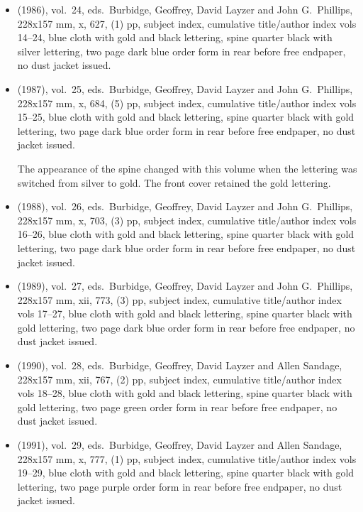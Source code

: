 \begin{itemize}
	\item (1986), vol.\ 24, eds.\ Burbidge, Geoffrey, David Layzer and John G.\ Phillips, 228x157 mm,
	x, 627, (1) pp, subject index, cumulative title/author index vols 14--24,
	blue cloth with gold and black lettering, spine quarter black with silver lettering,
	two page dark blue order form in rear before free endpaper, no dust jacket issued.

	\item (1987), vol.\ 25, eds.\ Burbidge, Geoffrey, David Layzer and John G.\ Phillips, 228x157 mm,
	x, 684, (5) pp, subject index, cumulative title/author index vols 15--25,
	blue cloth with gold and black lettering, spine quarter black with gold lettering,
	two page dark blue order form in rear before free endpaper, no dust jacket issued.
	
	The appearance of the spine changed with this volume when the lettering was switched
	from silver to gold.  The front cover retained the gold lettering. 

	\item (1988), vol.\ 26, eds.\ Burbidge, Geoffrey, David Layzer and John G.\ Phillips, 228x157 mm,
	x, 703, (3) pp, subject index, cumulative title/author index vols 16--26,
	blue cloth with gold and black lettering, spine quarter black with gold lettering,
	two page dark blue order form in rear before free endpaper, no dust jacket issued.

	\item (1989), vol.\ 27, eds.\ Burbidge, Geoffrey, David Layzer and John G.\ Phillips, 228x157 mm,
	xii, 773, (3) pp, subject index, cumulative title/author index vols 17--27,
	blue cloth with gold and black lettering, spine quarter black with gold lettering,
	two page dark blue order form in rear before free endpaper, no dust jacket issued.

	\item (1990), vol.\ 28, eds.\ Burbidge, Geoffrey, David Layzer and Allen Sandage, 228x157 mm,
	xii, 767, (2) pp, subject index, cumulative title/author index vols 18--28,
	blue cloth with gold and black lettering, spine quarter black with gold lettering,
	two page green order form in rear before free endpaper, no dust jacket issued.

	\item (1991), vol.\ 29, eds.\ Burbidge, Geoffrey, David Layzer and Allen Sandage, 228x157 mm,
	x, 777, (1) pp, subject index, cumulative title/author index vols 19--29,
	blue cloth with gold and black lettering, spine quarter black with gold lettering,
	two page purple order form in rear before free endpaper, no dust jacket issued.
	

\end{itemize}
